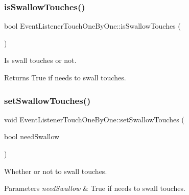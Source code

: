 \subsubsection{\texorpdfstring{is\+Swallow\+Touches()}{isSwallowTouches()}\hspace{0.1cm}{\footnotesize\ttfamily [2/2]}}
{\footnotesize\ttfamily bool Event\+Listener\+Touch\+One\+By\+One\+::is\+Swallow\+Touches (\begin{DoxyParamCaption}{ }\end{DoxyParamCaption})}

Is swall touches or not.

\begin{DoxyReturn}{Returns}
True if needs to swall touches. 
\end{DoxyReturn}
\mbox{\label{classEventListenerTouchOneByOne_a8638cf4b703328f5eba6b88cd03c46b2}} 
\subsubsection{\texorpdfstring{set\+Swallow\+Touches()}{setSwallowTouches()}\hspace{0.1cm}{\footnotesize\ttfamily [1/2]}}
{\footnotesize\ttfamily void Event\+Listener\+Touch\+One\+By\+One\+::set\+Swallow\+Touches (\begin{DoxyParamCaption}\item[{bool}]{need\+Swallow }\end{DoxyParamCaption})}

Whether or not to swall touches.


\begin{DoxyParams}{Parameters}
{\em need\+Swallow} & True if needs to swall touches. \\
\hline
\end{DoxyParams}
\mbox{\label{classEventListenerTouchOneByOne_a8638cf4b703328f5eba6b88cd03c46b2}} 
